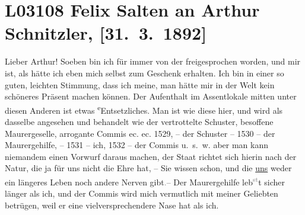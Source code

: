 

\section[Felix Salten an Arthur Schnitzler, {[}31. 3. 1892{]}]{L03108 Felix Salten an Arthur Schnitzler, {[}31. 3. 1892{]}}
\nopagebreak{}
\rehead{ }\normalsize\beginnumbering{}
\toendnotes[C]{\smallbreak\pagebreak[2]}
\toendnotes[C]{\smallbreak}
\toendnotes[C]{\smallbreak}
\pstart
           \noindent{}{\pb}Lieber Arthur! Soeben bin ich für immer von der
                  \label{K_L03108-1v}\label{K_L03108-1}
               freigesprochen worden, und mir ist, als hätte ich eben mich selbst zum Geschenk
               erhalten. Ich bin in einer so guten, leichten Stimmung, dass ich meine, man hätte mir
               in der Welt kein schöneres Präsent machen können. Der Aufenthalt {\pb}im Assentlokale mitten
               unter diesen Anderen ist etwas \substVorne{}\textsuperscript{e}\substDazwischen{}E\substHinten{}ntsetzliches. Man ist wie diese hier, und wird als
               dasselbe angesehen und behandelt wie der vertrottelte Schuster, besoffene
               Maurergeselle, arrogante Commis ec. ec. 1529, – der Schuster – 1530 – der
               Maurergehilfe, – 1531 – ich, 1532 – der Commis u. s. w. aber man kann niemandem einen
               Vorwurf daraus machen, der Staat richtet {\pb}sich hierin nach der
               Natur, die ja für uns nicht die Ehre hat, – Sie wissen schon, und die \uline{uns} weder ein längeres Leben noch andere Nerven
                  gibt\textcolor{gray}{.}– Der Maurergehilfe leb\substVorne{}\textsuperscript{\textcolor{gray}{st}}\substDazwischen{}t\substHinten{} sicher länger als ich, und der Commis wird mich vermutlich mit meiner
               Geliebten betrügen, weil er eine vielversprechendere Nase hat als ich.\pend
           
